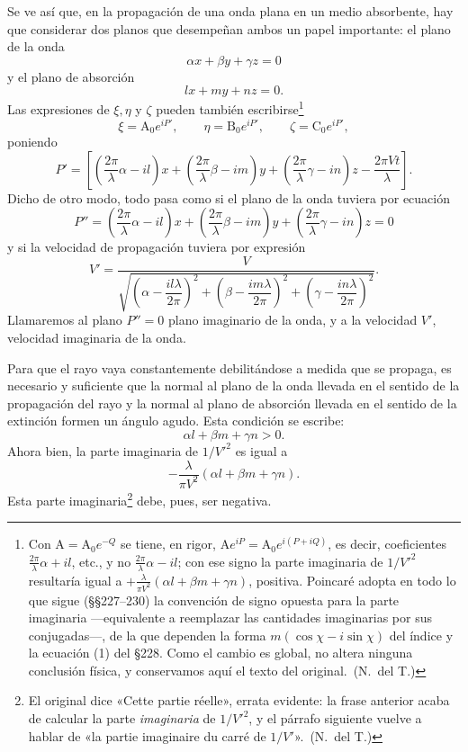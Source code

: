 Se ve así que, en la propagación de una onda plana en un medio
absorbente, hay que considerar dos planos que desempeñan ambos un papel
importante: el plano de la onda
\[
\alpha x+\beta y+\gamma z=0
\]
y el plano de absorción
\[
lx+my+nz=0.
\]
Las expresiones de $\xi,\eta$ y $\zeta$ pueden también
escribirse\footnote{Con $\mathrm{A}=\mathrm{A}_0e^{-Q}$ se tiene, en
rigor, $\mathrm{A}e^{iP}=\mathrm{A}_0e^{i(P+iQ)}$, es decir, coeficientes
$\frac{2\pi}{\lambda}\alpha+il$, etc., y no $\frac{2\pi}{\lambda}\alpha-il$;
con ese signo la parte imaginaria de $1/V'^2$ resultaría igual a
$+\frac{\lambda}{\pi V^2}(\alpha l+\beta m+\gamma n)$, positiva. Poincaré
adopta en todo lo que sigue (§§227--230) la convención de signo opuesta
para la parte imaginaria ---equivalente a reemplazar las cantidades
imaginarias por sus conjugadas---, de la que dependen la forma
$m(\cos\chi-i\sin\chi)$ del índice y la ecuación (1) del §228. Como el
cambio es global, no altera ninguna conclusión física, y conservamos aquí
el texto del original.~(N.~del T.)}
\[
\xi=\mathrm{A}_0e^{iP'},\qquad \eta=\mathrm{B}_0e^{iP'},\qquad
\zeta=\mathrm{C}_0e^{iP'},
\]
poniendo
\[
P'=\left[\left(\frac{2\pi}{\lambda}\alpha-il\right)x
+\left(\frac{2\pi}{\lambda}\beta-im\right)y
+\left(\frac{2\pi}{\lambda}\gamma-in\right)z-\frac{2\pi V t}{\lambda}\right].
\]
Dicho de otro modo, todo pasa como si el plano de la onda tuviera por
ecuación
\[
P''=\left(\frac{2\pi}{\lambda}\alpha-il\right)x
+\left(\frac{2\pi}{\lambda}\beta-im\right)y
+\left(\frac{2\pi}{\lambda}\gamma-in\right)z=0
\]
y si la velocidad de propagación tuviera por expresión
\[
V'=\dfrac{V}{\sqrt{\left(\alpha-\dfrac{il\lambda}{2\pi}\right)^2
+\left(\beta-\dfrac{im\lambda}{2\pi}\right)^2
+\left(\gamma-\dfrac{in\lambda}{2\pi}\right)^2}}.
\]
Llamaremos al plano $P''=0$ plano imaginario de la onda, y a la velocidad
$V'$, velocidad imaginaria de la onda.

Para que el rayo vaya constantemente debilitándose a medida que se
propaga, es necesario y suficiente que la normal al plano de la onda
llevada en el sentido de la propagación del rayo y la normal al plano de
absorción llevada en el sentido de la extinción formen un ángulo agudo.
Esta condición se escribe:
\[
\alpha l+\beta m+\gamma n>0.
\]
Ahora bien, la parte imaginaria de $1/V'^2$ es igual a
\[
-\frac{\lambda}{\pi V^2}(\alpha l+\beta m+\gamma n).
\]
Esta parte imaginaria\footnote{El original dice «Cette partie réelle»,
errata evidente: la frase anterior acaba de calcular la parte
\emph{imaginaria} de $1/V'^2$, y el párrafo siguiente vuelve a hablar de
«la partie imaginaire du carré de $1/V'$».~(N.~del T.)} debe, pues,
ser negativa.


